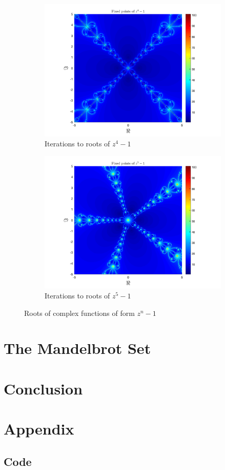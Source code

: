 \documentclass[letterpaper,11pt]{article}
\begin{document}
\begin{figure}
	\begin{subfigure}[b]{\fwidth}
		\includegraphics[width=\textwidth]{../Figures/Newton3.png}
		\caption{Iterations to roots of $z^4 - 1$}
		\label{fig:NI4}
	\end{subfigure}
	\begin{subfigure}[b]{\fwidth}
		\includegraphics[width=\textwidth]{../Figures/Newton4.png}
		\caption{Iterations to roots of $z^5 - 1$}
		\label{fig:NI5}
	\end{subfigure}
	\caption{Roots of complex functions of form $z^n - 1$}
	\label{fig:NI}
\end{figure}

\section{The Mandelbrot Set}

\section{Conclusion}

\section{Appendix}

\subsection{Code}

\end{document}
